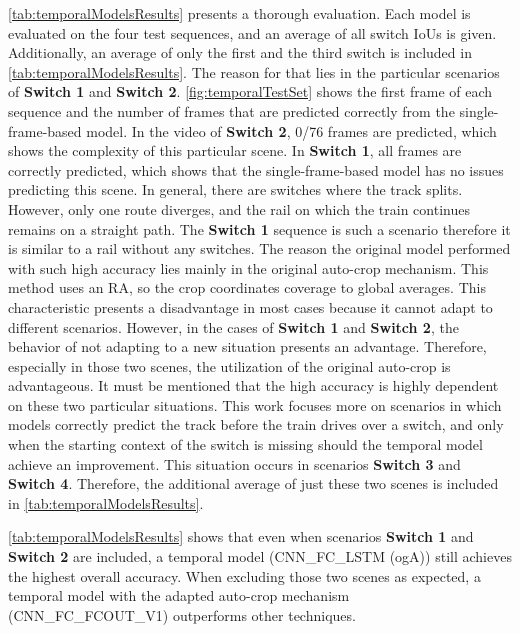 \noindent\autoref{tab:temporalModelsResults} presents a thorough evaluation.
Each model is evaluated on the four test sequences, and an average of all switch \ac{IoU}s is given.
Additionally, an average of only the first and the third switch is included in \autoref{tab:temporalModelsResults}.
The reason for that lies in the particular scenarios of \textbf{Switch 1} and \textbf{Switch 2}.
\autoref{fig:temporalTestSet} shows the first frame of each sequence and the number of frames that are predicted correctly from the single-frame-based model.
In the video of \textbf{Switch 2}, 0/76 frames are predicted, which shows the complexity of this particular scene.
In \textbf{Switch 1}, all frames are correctly predicted, which shows that the single-frame-based model has no issues predicting this scene.
In general, there are switches where the track splits.
However, only one route diverges, and the rail on which the train continues remains on a straight path.
The \textbf{Switch 1} sequence is such a scenario therefore it is similar to a rail without any switches.
The reason the original model performed with such high accuracy lies mainly in the original auto-crop mechanism.
This method uses an \ac{RA}, so the crop coordinates coverage to global averages.
This characteristic presents a disadvantage in most cases because it cannot adapt to different scenarios.
However, in the cases of \textbf{Switch 1} and \textbf{Switch 2}, the behavior of not adapting to a new situation presents an advantage.
Therefore, especially in those two scenes, the utilization of the original auto-crop is advantageous.
It must be mentioned that the high accuracy is highly dependent on these two particular situations.
This work focuses more on scenarios in which models correctly predict the track before the train drives over a switch, and only when the starting context of the switch is missing should the temporal model achieve an improvement.
This situation occurs in scenarios \textbf{Switch 3} and \textbf{Switch 4}.
Therefore, the additional average of just these two scenes is included in \autoref{tab:temporalModelsResults}.

\autoref{tab:temporalModelsResults} shows that even when scenarios \textbf{Switch 1} and \textbf{Switch 2} are included, a temporal model (CNN\_FC\_LSTM (ogA)) still achieves the highest overall accuracy.
When excluding those two scenes as expected, a temporal model with the adapted auto-crop mechanism (CNN\_FC\_FCOUT\_V1) outperforms other techniques.

